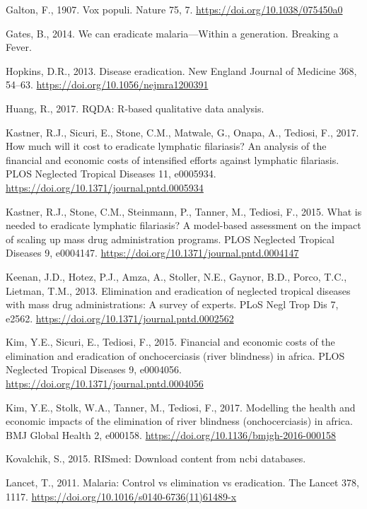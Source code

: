 \documentclass[]{article}
\begin{document}
\hypertarget{ref-Galton1907Voxpopuli}{}
Galton, F., 1907. Vox populi. Nature 75, 7.
\url{https://doi.org/10.1038/075450a0}

\hypertarget{ref-Gates2014}{}
Gates, B., 2014. We can eradicate malaria---Within a generation.
Breaking a Fever.

\hypertarget{ref-Hopkins2013}{}
Hopkins, D.R., 2013. Disease eradication. New England Journal of
Medicine 368, 54--63. \url{https://doi.org/10.1056/nejmra1200391}

\hypertarget{ref-Ronggui2017}{}
Huang, R., 2017. RQDA: R-based qualitative data analysis.

\hypertarget{ref-Kastner2017}{}
Kastner, R.J., Sicuri, E., Stone, C.M., Matwale, G., Onapa, A., Tediosi,
F., 2017. How much will it cost to eradicate lymphatic filariasis? An
analysis of the financial and economic costs of intensified efforts
against lymphatic filariasis. PLOS Neglected Tropical Diseases 11,
e0005934. \url{https://doi.org/10.1371/journal.pntd.0005934}

\hypertarget{ref-Kastner2015}{}
Kastner, R.J., Stone, C.M., Steinmann, P., Tanner, M., Tediosi, F.,
2015. What is needed to eradicate lymphatic filariasis? A model-based
assessment on the impact of scaling up mass drug administration
programs. PLOS Neglected Tropical Diseases 9, e0004147.
\url{https://doi.org/10.1371/journal.pntd.0004147}

\hypertarget{ref-Keenan2013}{}
Keenan, J.D., Hotez, P.J., Amza, A., Stoller, N.E., Gaynor, B.D., Porco,
T.C., Lietman, T.M., 2013. Elimination and eradication of neglected
tropical diseases with mass drug administrations: A survey of experts.
PLoS Negl Trop Dis 7, e2562.
\url{https://doi.org/10.1371/journal.pntd.0002562}

\hypertarget{ref-Kim2015}{}
Kim, Y.E., Sicuri, E., Tediosi, F., 2015. Financial and economic costs
of the elimination and eradication of onchocerciasis (river blindness)
in africa. PLOS Neglected Tropical Diseases 9, e0004056.
\url{https://doi.org/10.1371/journal.pntd.0004056}

\hypertarget{ref-Kim2017}{}
Kim, Y.E., Stolk, W.A., Tanner, M., Tediosi, F., 2017. Modelling the
health and economic impacts of the elimination of river blindness
(onchocerciasis) in africa. BMJ Global Health 2, e000158.
\url{https://doi.org/10.1136/bmjgh-2016-000158}

\hypertarget{ref-Kovalchik2015}{}
Kovalchik, S., 2015. RISmed: Download content from ncbi databases.

\hypertarget{ref-TheLancet2011}{}
Lancet, T., 2011. Malaria: Control vs elimination vs eradication. The
Lancet 378, 1117. \url{https://doi.org/10.1016/s0140-6736(11)61489-x}
\end{document}
